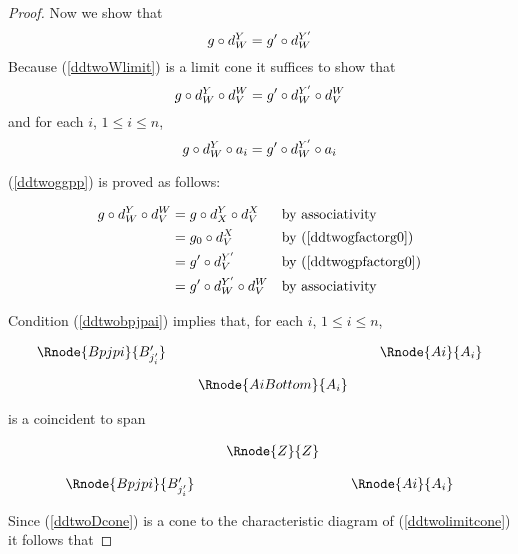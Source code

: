 \documentclass[10pt,a4paper]{scrartcl}
\begin{document}
\begin{proof}
\noindent Now we show that
\begin{equation}
\label{ddtwoggpcone}
g \circ d^{Y}_{W} = g' \circ d^{Y'}_{W}
\end{equation}
Because (\ref{ddtwoWlimit}) is a limit cone
it suffices to show that
\begin{equation}
\label{ddtwoggpp}
g \circ d^{Y}_{W} \circ d^{W}_{V} = g' \circ d^{Y'}_{W} \circ d^{W}_{V}
\end{equation}
and for each $i$, $1 \leq i \leq n$,
\begin{equation}
\label{ddtwoggpa}
g \circ d^{Y}_{W} \circ a_i = g' \circ d^{Y'}_{W} \circ a_i
\end{equation}

\noindent
(\ref{ddtwoggpp})  is proved as follows:

\begin{align*}
g \circ d^{Y}_{W} \circ d^{W}_{V} 
      &= g \circ d^{Y}_{X} \circ d^{X}_{V}   && \mbox{by associativity} \\
      &= g_0 \circ d^{X}_{V}                 && \mbox{by (\ref{ddtwogfactorg0})} \\
		  &= g' \circ d^{Y'}_{V}                 && \mbox{by (\ref{ddtwogpfactorg0})} \\
			&= g' \circ d^{Y'}_{W} \circ d^{W}_{V} && \mbox{by associativity} \\
\end{align*}

\noindent
Condition (\ref{ddtwobpjpai}) implies that, for each $i$, $1 \leq i \leq n$,
\begin{center}
\begin{equation}
\begin{array}{cp{0.1cm}cp{0.1cm} c}
\Rnode{Bpjpi}{B'_{j'_i}}& &                & & \Rnode{Ai}{A_i} \\ [0.4cm]
            & &\Rnode{AiBottom}{A_i}
\end{array}
\end{equation}
\end{center}
is a coincident  to span 
\begin{center}
\begin{equation}
\begin{array}{cp{0.1cm}cp{0.1cm} c}
            & &\Rnode{Z}{Z}                  \\ [0.4cm]
\Rnode{Bpjpi}{B'_{j'_i}}& &                & & \Rnode{Ai}{A_i} 
\end{array}
\end{equation}
\end{center}
Since (\ref{ddtwoDcone}) is a cone to the characteristic diagram
of (\ref{ddtwolimitcone}) it follows that


\end{proof}
\end{document}
